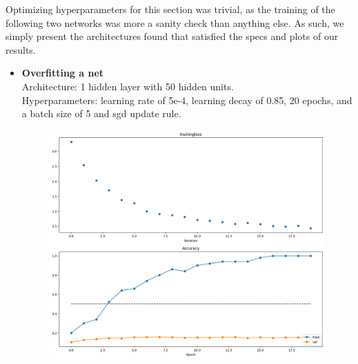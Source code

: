 Optimizing hyperparameters for this section was trivial, as the training of the following two networks was more a sanity check than anything else. As such, we simply present the architectures found that satisfied the specs and plots of our results.
\begin{itemize}[topsep=-15pt, noitemsep, nolistsep]
  
  \item \textbf{Overfitting a net}\\
    Architecture: 1 hidden layer with 50 hidden units.\\
    Hyperparameters: learning rate of 5e-4, learning decay of 0.85, 20 epochs, and a batch size of 5 and sgd update rule.
    

    \begin{figure}[!ht]
        \centering
        {{\includegraphics[scale = 0.32]{../nets/overfit_net/diagrams.png}}}  
    \end{figure}


\end{itemize}
